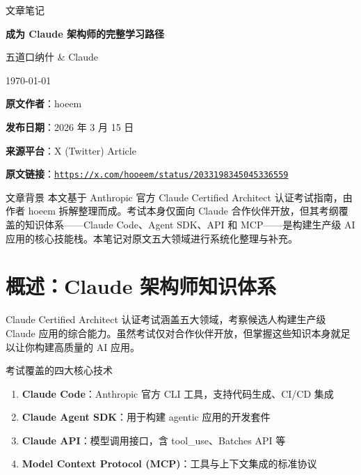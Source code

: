 \documentclass[a4paper]{article}
\newcommand{\notetitle}{成为 Claude 架构师的完整学习路径}
\newcommand{\noteauthors}{五道口纳什 \& Claude}
\newcommand{\notedate}{\today}
\newcommand{\articlechannel}{hoeem}
\newcommand{\articlepublishdate}{2026 年 3 月 15 日}
\newcommand{\articleurl}{https://x.com/hooeem/status/2033198345045336559}
\begin{document}
\begin{titlepage}
\centering
{\Large 文章笔记\par}
\vspace{1.2cm}
{\huge\bfseries \notetitle\par}
\vspace{0.8cm}
{\large \noteauthors\par}
\vspace{0.3cm}
{\large \notedate\par}
\vspace{2cm}

\begin{tcolorbox}[width=0.9\textwidth, colback=black!2!white, colframe=black!60, sharp corners]
\textbf{原文作者}：\articlechannel\par
\textbf{发布日期}：\articlepublishdate\par
\textbf{来源平台}：X (Twitter) Article\par
\textbf{原文链接}：\href{\articleurl}{\nolinkurl{\articleurl}}
\end{tcolorbox}

\vfill

\begin{knowledgebox}{文章背景}
本文基于 Anthropic 官方 Claude Certified Architect 认证考试指南，由作者 hoeem 拆解整理而成。考试本身仅面向 Claude 合作伙伴开放，但其考纲覆盖的知识体系——Claude Code、Agent SDK、API 和 MCP——是构建生产级 AI 应用的核心技能栈。本笔记对原文五大领域进行系统化整理与补充。
\end{knowledgebox}

\end{titlepage}

\tableofcontents
\newpage


\section{概述：Claude 架构师知识体系}

Claude Certified Architect 认证考试涵盖五大领域，考察候选人构建生产级 Claude 应用的综合能力。虽然考试仅对合作伙伴开放，但掌握这些知识本身就足以让你构建高质量的 AI 应用。

\begin{importantbox}{考试覆盖的四大核心技术}
\begin{enumerate}[leftmargin=1.5em]
    \item \textbf{Claude Code}：Anthropic 官方 CLI 工具，支持代码生成、CI/CD 集成
    \item \textbf{Claude Agent SDK}：用于构建 agentic 应用的开发套件
    \item \textbf{Claude API}：模型调用接口，含 tool\_use、Batches API 等
    \item \textbf{Model Context Protocol (MCP)}：工具与上下文集成的标准协议
\end{enumerate}
\end{importantbox}
\end{document}
